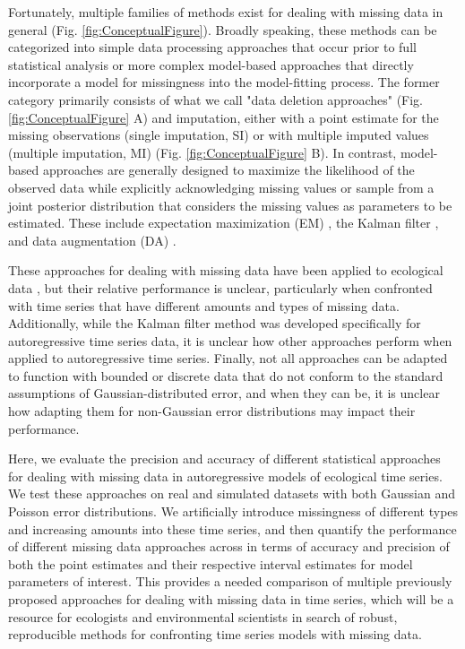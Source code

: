 \documentclass{article}
\begin{document}
Fortunately, multiple families of methods exist for dealing with missing data in general (Fig. \ref{fig:ConceptualFigure}). Broadly speaking, these methods can be categorized into simple data processing approaches that occur prior to full statistical analysis or more complex model-based approaches that directly incorporate a model for missingness into the model-fitting process. The former category primarily consists of what we call "data deletion approaches" (Fig. \ref{fig:ConceptualFigure} A) and imputation, either with a point estimate for the missing observations (single imputation, SI) or with multiple imputed values (multiple imputation, MI) (Fig. \ref{fig:ConceptualFigure} B)\citep{nakagawa_model_2011, nakagawa_missing_2015, kang2013prevention, onkelinx_working_2017, rubin1996multiple, rubin1988overview}. In contrast, model-based approaches are generally designed to maximize the likelihood of the observed data while explicitly acknowledging missing values or sample from a joint posterior distribution that considers the missing values as parameters to be estimated. These include expectation maximization (EM) \citep{nadjafi2022expectation,li2019expectation, kang2013prevention}, the Kalman filter \citep{kalman_filter_1960}, 
and data augmentation (DA) \citep{kong_sequential_1994}.  

 These approaches for dealing with missing data have been applied to ecological data \citep{Newman2023, Soldaat2007}, but their relative performance is unclear, particularly when confronted with time series that have different amounts and types of missing data. Additionally, while the Kalman filter method was developed specifically for autoregressive time series data, it is unclear how other approaches perform when applied to autoregressive time series. Finally, not all approaches can be adapted to function with bounded or discrete data that do not conform to the standard assumptions of Gaussian-distributed error, and when they can be, it is unclear how adapting them for non-Gaussian error distributions may impact their performance.

Here, we evaluate the precision and accuracy of different statistical approaches for dealing with missing data in autoregressive models of ecological time series. We test these approaches on real and simulated datasets with both Gaussian and Poisson error distributions. We artificially introduce missingness of different types and increasing amounts into these time series, and then quantify the performance of different missing data approaches across in terms of accuracy and precision of both the point estimates and their respective interval estimates for model parameters of interest. This provides a needed comparison of multiple previously proposed approaches for dealing with missing data in time series, which will be a resource for ecologists and environmental scientists in search of robust, reproducible methods for confronting time series models with missing data.
\end{document}
